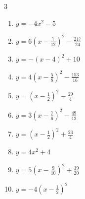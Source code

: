 \begin{multicols}{3}
\begin{enumerate}
\columnbreak %

  \item $\displaystyle y=-4x^{2}-5$

        \phantom{$\displaystyle 頂点\left( 0 , -5 \right)$}

  \item $\displaystyle y=6\left( x-\frac{7}{12}\right)^{2}-\frac{217}{24}$


  \item $\displaystyle y=-\left( x-4\right)^{2}+10$

        \phantom{$\displaystyle 頂点\left( 4 , 10 \right)$}

  \item $\displaystyle y=4\left( x-\frac{5}{8}\right)^{2}-\frac{153}{16}$


  \item $\displaystyle y=\left( x-\frac{1}{2}\right)^{2}-\frac{29}{4}$


  \item $\displaystyle y=3\left( x-\frac{7}{6}\right)^{2}-\frac{49}{12}$


  \item $\displaystyle y=\left( x-\frac{1}{2}\right)^{2}+\frac{23}{4}$


  \item $\displaystyle y=4x^{2}+4$

        \phantom{$\displaystyle 頂点\left( 0 , 4 \right)$}

  \item $\displaystyle y=5\left( x-\frac{9}{10}\right)^{2}+\frac{39}{20}$


  \item $\displaystyle y=-4\left( x-\frac{1}{2}\right)^{2}$



\end{enumerate}
\end{multicols}
